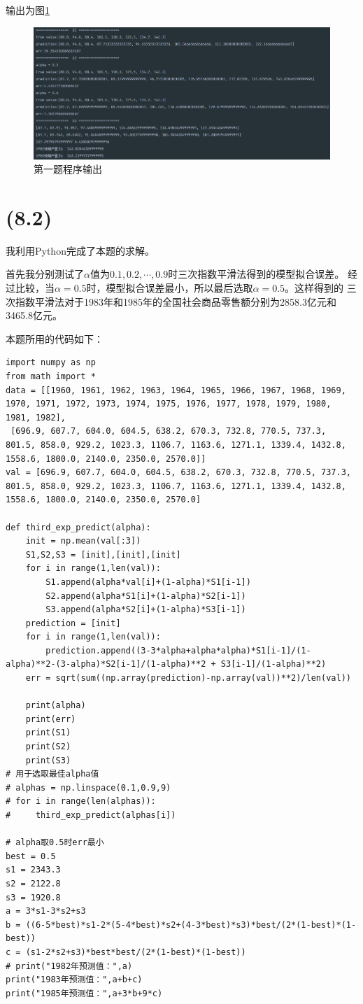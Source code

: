 \documentclass[a4paper]{article}
\begin{document}
输出为图\ref*{q1}
\begin{figure}[!h]
    \centering
    \includegraphics*[width = \textwidth]{q1.png}
    \caption{第一题程序输出}\label{q1}
\end{figure}
\newpage
\section{(8.2)}
我利用Python完成了本题的求解。

首先我分别测试了$\alpha$值为$0.1,0.2,\cdots,0.9$时三次指数平滑法得到的模型拟合误差。
经过比较，当$\alpha=0.5$时，模型拟合误差最小，所以最后选取$\alpha=0.5$。这样得到的
三次指数平滑法对于1983年和1985年的全国社会商品零售额分别为2858.3亿元和3465.8亿元。

本题所用的代码如下：
\begin{lstlisting}[emph={[3]alpha},emphstyle={[3]\color{vscode_parametercolor}},emph={[4]RegressionModel,GameState,MinimaxAgent,AlphaBetaAgent},emphstyle={[4]\color{vscode_classcolor}}]
import numpy as np
from math import *
data = [[1960, 1961, 1962, 1963, 1964, 1965, 1966, 1967, 1968, 1969, 1970, 1971, 1972, 1973, 1974, 1975, 1976, 1977, 1978, 1979, 1980, 1981, 1982],
 [696.9, 607.7, 604.0, 604.5, 638.2, 670.3, 732.8, 770.5, 737.3, 801.5, 858.0, 929.2, 1023.3, 1106.7, 1163.6, 1271.1, 1339.4, 1432.8, 1558.6, 1800.0, 2140.0, 2350.0, 2570.0]]
val = [696.9, 607.7, 604.0, 604.5, 638.2, 670.3, 732.8, 770.5, 737.3, 801.5, 858.0, 929.2, 1023.3, 1106.7, 1163.6, 1271.1, 1339.4, 1432.8, 1558.6, 1800.0, 2140.0, 2350.0, 2570.0]

def third_exp_predict(alpha):
    init = np.mean(val[:3])
    S1,S2,S3 = [init],[init],[init]
    for i in range(1,len(val)):
        S1.append(alpha*val[i]+(1-alpha)*S1[i-1])
        S2.append(alpha*S1[i]+(1-alpha)*S2[i-1])
        S3.append(alpha*S2[i]+(1-alpha)*S3[i-1])
    prediction = [init]
    for i in range(1,len(val)):
        prediction.append((3-3*alpha+alpha*alpha)*S1[i-1]/(1-alpha)**2-(3-alpha)*S2[i-1]/(1-alpha)**2 + S3[i-1]/(1-alpha)**2)
    err = sqrt(sum((np.array(prediction)-np.array(val))**2)/len(val))

    print(alpha)
    print(err)
    print(S1)
    print(S2)
    print(S3)
# 用于选取最佳alpha值
# alphas = np.linspace(0.1,0.9,9)
# for i in range(len(alphas)):
#     third_exp_predict(alphas[i])

# alpha取0.5时err最小
best = 0.5
s1 = 2343.3
s2 = 2122.8
s3 = 1920.8
a = 3*s1-3*s2+s3
b = ((6-5*best)*s1-2*(5-4*best)*s2+(4-3*best)*s3)*best/(2*(1-best)*(1-best))
c = (s1-2*s2+s3)*best*best/(2*(1-best)*(1-best))
# print("1982年预测值：",a)
print("1983年预测值：",a+b+c)
print("1985年预测值：",a+3*b+9*c)
\end{lstlisting}
\newpage
\end{document}
